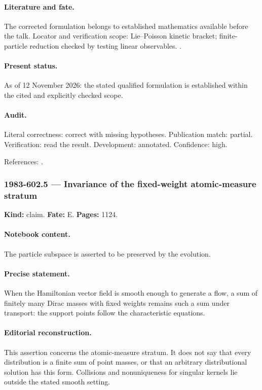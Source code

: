\paragraph{Literature and fate.} The corrected formulation belongs to established mathematics available before the talk. Locator and verification scope: Lie--Poisson kinetic bracket; finite-particle reduction checked by testing linear observables. \cite{morrison1980maxwell}.

\paragraph{Present status.} As of 12 November 2026: the stated qualified formulation is established within the cited and explicitly checked scope.

\paragraph{Audit.} Literal correctness: correct with missing hypotheses. Publication match: partial. Verification: read the result. Development: annotated. Confidence: high.

\noindent References: \citep{morrison1980maxwell}.\par

\subsubsection{1983-602.5 --- Invariance of the fixed-weight atomic-measure stratum}

\label{item:1983-602.5}

\noindent\textbf{Kind:} claim. \textbf{Fate:} E. \textbf{Pages:} 1124.\par

\paragraph{Notebook content.} The particle subspace is asserted to be preserved by the evolution.

\paragraph{Precise statement.} When the Hamiltonian vector field is smooth enough to generate a flow, a sum of finitely many Dirac masses with fixed weights remains such a sum under transport: the support points follow the characteristic equations.

\paragraph{Editorial reconstruction.} This assertion concerns the atomic-measure stratum. It does not say that every distribution is a finite sum of point masses, or that an arbitrary distributional solution has this form. Collisions and nonuniqueness for singular kernels lie outside the stated smooth setting.

